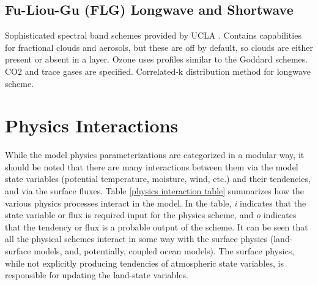 \subsection {Fu-Liou-Gu (FLG) Longwave and Shortwave}

Sophisticated spectral band schemes provided by UCLA  \citep{gu11,fu92}.
Contains capabilities for fractional clouds and aerosols, but these are off by default,
so clouds are either present or absent in a layer. Ozone uses profiles similar to the
Goddard schemes. CO2 and trace gases are specified.
Correlated-k distribution method for longwave scheme.

\section {Physics Interactions}

While the model physics parameterizations are categorized in a modular way,
it should be noted that there are many interactions between them via the
model state variables (potential temperature, moisture, wind, etc.)
and their tendencies, and via the surface fluxes.
Table \ref {physics interaction table} summarizes how the various physics
processes interact in the model. In the table, {\em i} indicates that the 
state variable or flux is required input for the physics scheme, and {\em o}
indicates that the tendency or flux is a probable output of the scheme.
It can be seen that all the physical schemes interact in some way with the surface
physics (land-surface models, and, potentially, coupled ocean models).
The surface physics, while not explicitly producing tendencies of atmospheric
state variables, is responsible for updating the land-state variables.

